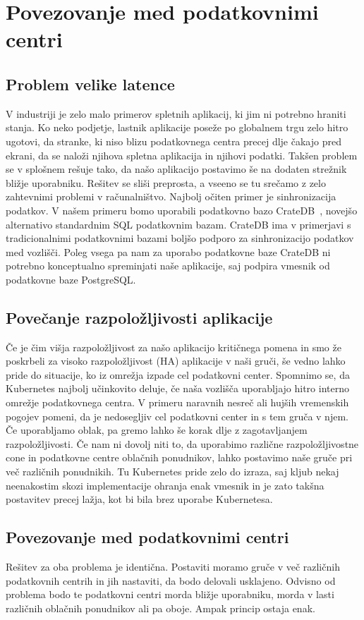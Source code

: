 \documentclass[a4paper, 12pt]{book}
\begin{document}
\chapter{Povezovanje med podatkovnimi centri}
\label{povezovanje-med-centri}
\section{Problem velike latence}
V industriji je zelo malo primerov spletnih aplikacij, ki jim ni potrebno hraniti stanja. 
Ko neko podjetje, lastnik aplikacije poseže po globalnem trgu zelo hitro ugotovi, da stranke, ki niso blizu podatkovnega centra precej dlje čakajo pred ekrani, da se naloži njihova spletna aplikacija in njihovi podatki.
Takšen problem se v splošnem rešuje tako, da našo aplikacijo postavimo še na dodaten strežnik bližje uporabniku. 
Rešitev se sliši preprosta, a vseeno se tu srečamo z zelo zahtevnimi problemi v računalništvo.
Najbolj očiten primer je sinhronizacija podatkov.
V našem primeru bomo uporabili podatkovno bazo CrateDB~\cite{cratedb}, novejšo alternativo standardnim SQL podatkovnim bazam.
CrateDB ima v primerjavi s tradicionalnimi podatkovnimi bazami boljšo podporo za sinhronizacijo podatkov med vozlišči.
Poleg vsega pa nam za uporabo podatkovne baze CrateDB ni potrebno konceptualno spreminjati naše aplikacije, saj podpira vmesnik od podatkovne baze PostgreSQL.
\section{Povečanje razpoložljivosti aplikacije}
Če je čim višja razpoložljivost za našo aplikacijo kritičnega pomena in smo že poskrbeli za visoko razpoložljivost (HA) aplikacije v naši gruči, še vedno lahko pride do situacije, ko iz omrežja izpade cel podatkovni center.
Spomnimo se, da Kubernetes najbolj učinkovito deluje, če naša vozlišča uporabljajo hitro interno omrežje podatkovnega centra.
V primeru naravnih nesreč ali hujših vremenskih pogojev pomeni, da je nedosegljiv cel podatkovni center in s tem gruča v njem.
Če uporabljamo oblak, pa gremo lahko še korak dlje z zagotavljanjem razpoložljivosti.
Če nam ni dovolj niti to, da uporabimo različne razpoložljivostne cone in podatkovne centre oblačnih ponudnikov, lahko postavimo naše gruče pri več različnih ponudnikih.
Tu Kubernetes pride zelo do izraza, saj kljub nekaj neenakostim skozi implementacije ohranja enak vmesnik in je zato takšna postavitev precej lažja, kot bi bila brez uporabe Kubernetesa.
\section{Povezovanje med podatkovnimi centri}
Rešitev za oba problema je identična.
Postaviti moramo gruče v več različnih podatkovnih centrih in jih nastaviti, da bodo delovali usklajeno.
Odvisno od problema bodo te podatkovni centri morda bližje uporabniku, morda v lasti različnih oblačnih ponudnikov ali pa oboje.
Ampak princip ostaja enak.
\end{document}
